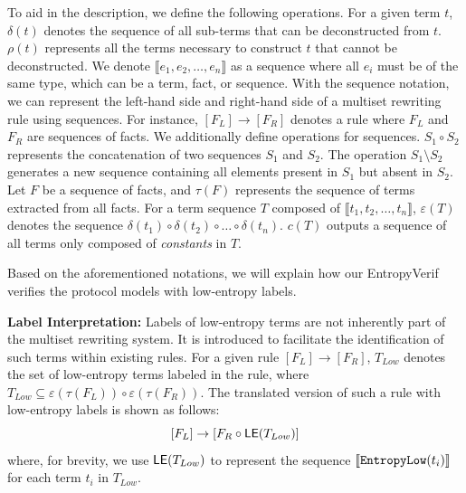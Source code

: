 \documentclass[../main.tex]{subfiles}  %
\begin{document}
To aid in the description, we define the following operations.
For a given term $t$, $\delta(t)$ denotes the sequence of all sub-terms that can be deconstructed from $t$.
$\rho(t)$ represents all the terms necessary to construct $t$ that cannot be deconstructed.
We denote $\llbracket e_1, e_2, \ldots, e_n \rrbracket$ as a sequence where all $e_i$ must be of the same type, which can be a term, fact, or sequence.
With the sequence notation, we can represent the left-hand side and right-hand side of a multiset rewriting rule using sequences.
For instance, $[F_{L}] \rightarrow [F_{R}]$ denotes a rule where $F_{L}$ and $F_{R}$ are sequences of facts.
We additionally define operations for sequences.
$S_1 \circ S_2$ represents the concatenation of two sequences $S_1$ and $S_2$.
The operation $S_1 \setminus S_2$ generates a new sequence containing all elements present in $S_1$ but absent in $S_2$.
Let $F$ be a sequence of facts, and $\tau(F)$ represents the sequence of terms extracted from all facts.
For a term sequence $T$ composed of $\llbracket t_1, t_2, \ldots, t_n \rrbracket$, $\varepsilon(T)$ denotes the sequence $\delta(t_1) \circ \delta(t_2) \circ \ldots \circ \delta(t_n)$.
$c(T)$ outputs a sequence of all terms only composed of \emph{constants} in $T$.

Based on the aforementioned notations, we will explain how our EntropyVerif verifies the protocol models with low-entropy labels.

\noindent
\textbf{Label Interpretation:} 
Labels of low-entropy terms are not inherently part of the multiset rewriting system. 
It is introduced to facilitate the identification of such terms within existing rules.
For a given rule $[F_L] \rightarrow [F_R]$, $T_{Low}$ denotes the set of low-entropy terms labeled in the rule, where $T_{Low} \subseteq \varepsilon(\tau(F_L)) \circ \varepsilon(\tau(F_R))$.
The translated version of such a rule with low-entropy labels is shown as follows:
\[
    [F_L] \rightarrow [F_R \circ \text{\textsf{LE}}(T_{Low})]
\]
where, for brevity, we use $\text{\textsf{LE}}(T_{Low})$ to represent the sequence $\llbracket \text{{\ttfamily EntropyLow}}(t_i) \rrbracket$ for each term $t_i$ in $T_{Low}$.
\end{document}
